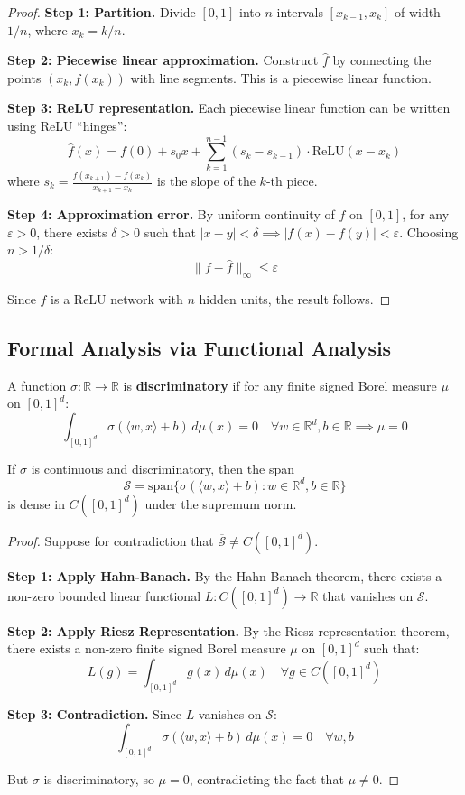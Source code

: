 \documentclass[main.tex]{subfiles}
\begin{document}
\begin{proof}
\textbf{Step 1: Partition.} Divide $[0,1]$ into $n$ intervals $[x_{k-1}, x_k]$ of width $1/n$, where $x_k = k/n$.

\textbf{Step 2: Piecewise linear approximation.} Construct $\hat{f}$ by connecting the points $(x_k, f(x_k))$ with line segments. This is a piecewise linear function.

\textbf{Step 3: ReLU representation.} Each piecewise linear function can be written using ReLU ``hinges'':
$$\hat{f}(x) = f(0) + s_0 x + \sum_{k=1}^{n-1} (s_k - s_{k-1}) \cdot \text{ReLU}(x - x_k)$$
where $s_k = \frac{f(x_{k+1}) - f(x_k)}{x_{k+1} - x_k}$ is the slope of the $k$-th piece.

\textbf{Step 4: Approximation error.} By uniform continuity of $f$ on $[0,1]$, for any $\varepsilon > 0$, there exists $\delta > 0$ such that $|x - y| < \delta \implies |f(x) - f(y)| < \varepsilon$. Choosing $n > 1/\delta$:
$$\|f - \hat{f}\|_\infty \leq \varepsilon$$

Since $\hat{f}$ is a ReLU network with $n$ hidden units, the result follows.
\end{proof}

\subsection{Formal Analysis via Functional Analysis}

\begin{definition}
A function $\sigma: \mathbb{R} \to \mathbb{R}$ is \textbf{discriminatory} if for any finite signed Borel measure $\mu$ on $[0,1]^d$:
$$\int_{[0,1]^d} \sigma(\langle w, x \rangle + b) \, d\mu(x) = 0 \quad \forall w \in \mathbb{R}^d, b \in \mathbb{R} \implies \mu = 0$$
\end{definition}

\begin{theorem}[Cybenko]
If $\sigma$ is continuous and discriminatory, then the span
$$\mathcal{S} = \text{span}\{\sigma(\langle w, x \rangle + b) : w \in \mathbb{R}^d, b \in \mathbb{R}\}$$
is dense in $C([0,1]^d)$ under the supremum norm.
\end{theorem}

\begin{proof}
Suppose for contradiction that $\overline{\mathcal{S}} \neq C([0,1]^d)$.

\textbf{Step 1: Apply Hahn-Banach.} By the Hahn-Banach theorem, there exists a non-zero bounded linear functional $L: C([0,1]^d) \to \mathbb{R}$ that vanishes on $\mathcal{S}$.

\textbf{Step 2: Apply Riesz Representation.} By the Riesz representation theorem, there exists a non-zero finite signed Borel measure $\mu$ on $[0,1]^d$ such that:
$$L(g) = \int_{[0,1]^d} g(x) \, d\mu(x) \quad \forall g \in C([0,1]^d)$$

\textbf{Step 3: Contradiction.} Since $L$ vanishes on $\mathcal{S}$:
$$\int_{[0,1]^d} \sigma(\langle w, x \rangle + b) \, d\mu(x) = 0 \quad \forall w, b$$

But $\sigma$ is discriminatory, so $\mu = 0$, contradicting the fact that $\mu \neq 0$.
\end{proof}
\end{document}
